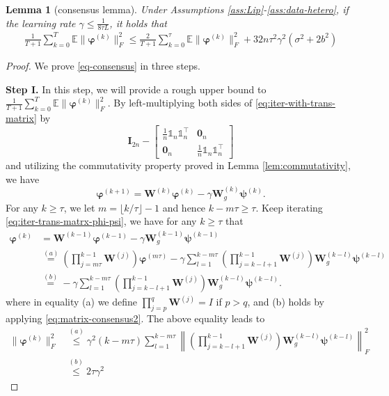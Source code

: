 \documentclass{article}
\newcommand{\vphi}{\bm{\varphi}}
\newcommand{\vpsi}{\bm{\psi}}
\newcommand{\vzero}{\mathbf{0}}
\newcommand{\vI}{\mathbf{I}}
\newcommand{\vW}{\mathbf{W}}
\newcommand{\ko}{{(k)}}
\newcommand{\kp}{{(k+1)}}
\newcommand{\bbE}{\mathbb{E}}
\newcommand{\bbone}{\mathds{1}}
\newcommand{\avekT}{\frac{1}{T+1}\sum_{k=0}^T}
\theoremstyle{plain}
\newtheorem{lemma}[theorem]{Lemma}
\theoremstyle{definition}
\begin{document}
\begin{lemma}[\sc consensus lemma] 
\label{lem:consenus-dsgd}
Under Assumptions \ref{ass:Lip}-\ref{ass:data-hetero}, if the learning rate $\gamma \le \frac{1}{8\tau L}$, it holds that 
\begin{align}\label{eq-consensus}
\avekT \bbE\|\vphi^\ko\|^2_F
\leq \frac{2}{T+1}\sum_{k=0}^\tau\bbE\|\vphi^\ko\|^2_F + 32 n\tau^2\gamma^2(\sigma^2 + 2b^2) 
\end{align}
\end{lemma}
\begin{proof}
We prove \eqref{eq-consensus} in three steps.

\textbf{Step I.} In this step, we will provide a rough upper bound to $\avekT \bbE\|\vphi^\ko\|^2_F$. By left-multiplying both sides of \eqref{eq:iter-with-trans-matrix} by 
$$\vI_{2n}-
\left[
\begin{array}{cc}
    \frac{1}{n}\bbone_n\bbone_n^\top & \vzero_n \\
    \vzero_n & \frac{1}{n}\bbone_n\bbone_n^\top
\end{array}
\right]$$ 
and utilizing the commutativity property proved in Lemma \ref{lem:commutativity}, we have
\begin{equation}
\label{eq:iter-trans-matrx-phi-psi}
\vphi^\kp=\vW^\ko\vphi^\ko-\gamma\vW^\ko_g \vpsi^\ko.
\end{equation}
For any $k\ge \tau$, we let $m = \lfloor k/\tau \rfloor - 1 $ and hence $k - m\tau \ge \tau$. Keep iterating \eqref{eq:iter-trans-matrx-phi-psi}, we have for any $k\geq \tau$ that 
\begin{align*}
\vphi^\ko&=\vW^{(k-1)}\vphi^{(k-1)}-\gamma\vW^{(k-1)}_g \vpsi^{(k-1)}\\
&\stackrel{(a)}{=}\left(\prod_{j=m\tau}^{k-1}\vW^{(j)}\right)\vphi^{(m\tau)}-\gamma\sum_{l=1}^{k-m\tau}\left(\prod_{j=k-l+1}^{k-1}\vW^{(j)}\right)\vW^{(k-l)}_g\vpsi^{(k-l)}\\
&\stackrel{(b)}{=}-\gamma\sum_{l=1}^{k-m\tau}\left(\prod_{j=k-l+1}^{k-1}\vW^{(j)}\right)\vW^{(k-l)}_g\vpsi^{(k-l)}. 
\end{align*}
where in equality (a) we define $\prod_{j=p}^{q} \vW^{(j)} = I$ if $p > q$, and (b) holds by applying \eqref{eq:matrix-consensus2}. The above equality leads to
\begin{align*}
\|\vphi^\ko\|^2_F&
\stackrel{(a)}{\leq}\gamma^2(k-m\tau)
\sum_{l=1}^{k-m\tau}\left\|\left(\prod_{j=k-l+1}^{k-1}\vW^{(j)}\right)\vW^{(k-l)}_g\vpsi^{(k-l)}\right\|^2_F\\
&\stackrel{(b)}{\leq} 2\tau\gamma^2

\end{align*}
\end{proof}
\end{document}
